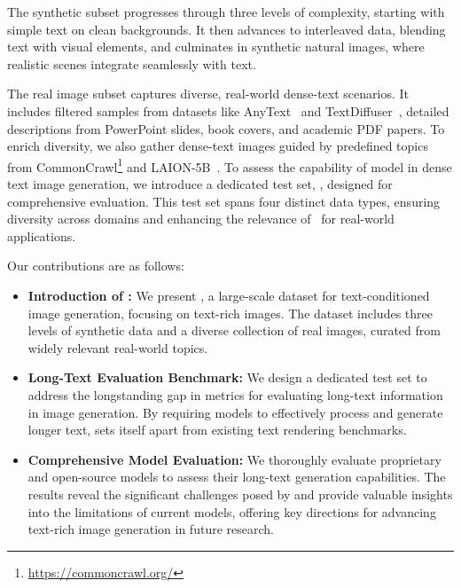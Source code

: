 The synthetic subset progresses through three levels of complexity, starting with simple text on clean backgrounds. 
It then advances to interleaved data, blending text with visual elements, and culminates in synthetic natural images, where realistic scenes integrate seamlessly with text.

The real image subset captures diverse, real-world dense-text scenarios. 
It includes filtered samples from datasets like AnyText~\cite{anytext} and TextDiffuser~\cite{textdiffuser}, detailed descriptions from PowerPoint slides, book covers, and academic PDF papers. 
To enrich diversity, we also gather dense-text images guided by predefined topics from CommonCrawl\footnote{\url{https://commoncrawl.org/}} and LAION-5B~\cite{laion}.
To assess the capability of model in dense text image generation, we introduce a dedicated test set, \EvalDatasetName, designed for comprehensive evaluation. 
This test set spans four distinct data types, ensuring diversity across domains and enhancing the relevance of \DatasetName~for real-world applications. 

Our contributions are as follows: 
\begin{itemize}
\item \textbf{Introduction of \DatasetName:}  
We present \DatasetName, a large-scale dataset for text-conditioned image generation, focusing on text-rich images. 
The dataset includes three levels of synthetic data and a diverse collection of real images, curated from widely relevant real-world topics.

\item \textbf{Long-Text Evaluation Benchmark:}  
We design a dedicated test set to address the longstanding gap in metrics for evaluating long-text information in image generation. By requiring models to effectively process and generate longer text, \DatasetName sets itself apart from existing text rendering benchmarks.

\item \textbf{Comprehensive Model Evaluation:}  
We thoroughly evaluate proprietary and open-source models to assess their long-text generation capabilities. 
The results reveal the significant challenges posed by \DatasetName and provide valuable insights into the limitations of current models, offering key directions for advancing text-rich image generation in future research.
\end{itemize}

